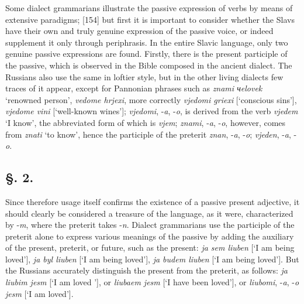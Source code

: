 Some dialect grammarians illustrate the passive expression of verbs by means of extensive paradigms; [154] but first it is important to consider whether the Slavs have their own and truly genuine expression of the passive voice, or indeed supplement it only through periphrasis. In the entire Slavic language, only two genuine passive expressions are found. Firstly, there is the present participle of the passive, which is observed in the Bible composed in the ancient dialect. The Russians also use the same in loftier style, but in the other living dialects few traces of it appear, except for Pannonian phrases such as \textit{znami чelovek} ‘renowned person’, \textit{vedome hrjexi}, more correctly \textit{vjedomi griexi} [‘conscious sins’], \textit{vjedome vini} [‘well-known wines’]; \textit{vjedomi}, -\textit{a}, -\textit{o}, is derived from the verb \textit{vjedem} ‘I know’, the abbreviated form of which is \textit{vjem}; \textit{znami}, -\textit{a}, -\textit{o}, however, comes from \textit{znati} ‘to know’, hence the participle of the preterit \textit{znan}, -\textit{a}, -\textit{o}; \textit{vjeden}, -\textit{a}, -\textit{o}.

\subsection*{\hspace*{\fill}§. 2.\hspace*{\fill}}

Since therefore usage itself confirms the existence of a passive present adjective, it should clearly be considered a treasure of the language, as it were, characterized by -\textit{m}, where the preterit takes -\textit{n}. Dialect grammarians use the participle of the preterit alone to express various meanings of the passive by adding the auxiliary of the present, preterit, or future, such as the present: \textit{ja sem liuben} [‘I am being loved’], \textit{ja byl liuben} [‘I am being loved’], \textit{ja budem liuben} [‘I am being loved’]. But the Russians accurately distinguish the present from the preterit, as follows: \textit{ja liubim jesm} [‘I am loved ’], or \textit{liubaem jesm} [‘I have been loved’], or \textit{liubomi}, -\textit{a}, -\textit{o} \textit{jesm} [‘I am loved’].

